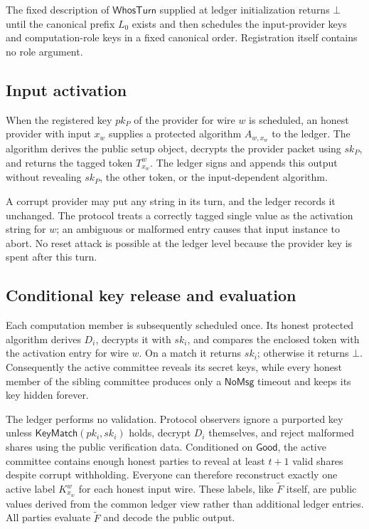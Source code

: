 The fixed description of $\mathsf{WhosTurn}$ supplied at ledger initialization
returns $\bot$ until the canonical prefix $L_0$ exists and then schedules the
input-provider keys and computation-role keys in a fixed canonical order.
Registration itself contains no role argument.

\subsection{Input activation}

When the registered key $pk_P$ of the provider for wire $w$ is scheduled,
an honest provider with input $x_w$ supplies a protected algorithm $A_{w,x_w}$
to the ledger. The algorithm derives the public setup object, decrypts the
provider packet using $sk_P$, and returns the tagged token $T^w_{x_w}$. The
ledger signs and appends this output without revealing $sk_P$, the other
token, or the input-dependent algorithm.

A corrupt provider may put any string in its turn, and the ledger records it
unchanged. The protocol treats a correctly tagged single value as the
activation string for $w$; an ambiguous or malformed entry causes that input
instance to abort. No reset attack is possible at the ledger level because
the provider key is spent after this turn.

\subsection{Conditional key release and evaluation}

Each computation member is subsequently scheduled once. Its honest protected
algorithm derives $D_i$, decrypts it with $sk_i$, and compares the enclosed
token with the activation entry for wire $w$. On a match it returns $sk_i$;
otherwise it returns $\bot$. Consequently the active committee reveals its
secret keys, while every honest member of the sibling committee produces only
a $\mathsf{NoMsg}$ timeout and keeps its key hidden forever.

The ledger performs no validation. Protocol observers ignore a purported
key unless $\mathsf{KeyMatch}(pk_i,sk_i)$ holds, decrypt $D_i$ themselves,
and reject malformed shares using the public verification data. Conditioned
on $\mathsf{Good}$, the active committee contains enough honest parties to
reveal at least $t+1$ valid shares despite corrupt withholding. Everyone can
therefore reconstruct exactly one active label $K^w_{x_w}$ for each honest
input wire. These labels, like $\widetilde F$ itself, are public values
derived from the common ledger view rather than additional ledger entries.
All parties evaluate $\widetilde F$ and decode the public output.

